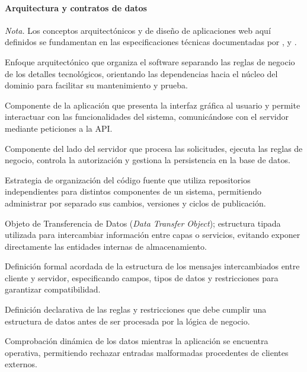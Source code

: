 \paragraph{Arquitectura y contratos de datos}

\noindent\textit{Nota.} Los conceptos arquitectónicos y de diseño de aplicaciones web aquí definidos se fundamentan en las especificaciones 
técnicas documentadas por \textcite{suarez2025sistema}, \textcite{ahmed2023web} y \textcite{tandrio2026web}.

    Enfoque arquitectónico que organiza el software separando las reglas de negocio de los detalles tecnológicos,
    orientando las dependencias hacia el núcleo del dominio para facilitar su mantenimiento y prueba.

    Componente de la aplicación que presenta la interfaz gráfica al usuario y permite interactuar con las funcionalidades del sistema, 
    comunicándose con el servidor mediante peticiones a la API.

    Componente del lado del servidor que procesa las solicitudes, ejecuta las reglas de negocio, controla la autorización 
    y gestiona la persistencia en la base de datos.

    Estrategia de organización del código fuente que utiliza repositorios independientes para distintos componentes de un sistema, 
    permitiendo administrar por separado sus cambios, versiones y ciclos de publicación.

    Objeto de Transferencia de Datos (\textit{Data Transfer Object}); estructura tipada utilizada para intercambiar información entre capas o servicios, 
    evitando exponer directamente las entidades internas de almacenamiento.

    Definición formal acordada de la estructura de los mensajes intercambiados entre cliente y servidor, especificando campos, 
    tipos de datos y restricciones para garantizar compatibilidad.

    Definición declarativa de las reglas y restricciones que debe cumplir una estructura de datos antes de ser procesada por la lógica de negocio.

    Comprobación dinámica de los datos mientras la aplicación se encuentra operativa, permitiendo rechazar entradas malformadas procedentes de clientes externos.

